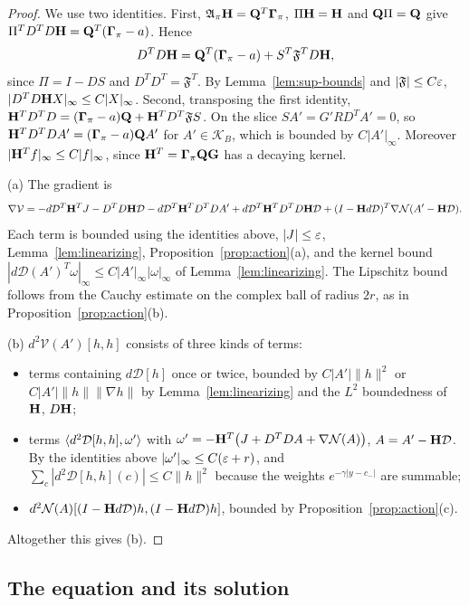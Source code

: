 \begin{proof}
We use two identities. First, $\mathfrak A_\pi\mathbf H=\mathbf Q^T\boldsymbol\Gamma_\pi$, $\Pi\mathbf H=\mathbf H$ and $\mathbf Q\Pi=\mathbf Q$ give $\Pi^TD^TD\mathbf H=\mathbf Q^T(\boldsymbol\Gamma_\pi-a)$. Hence
\[
D^TD\mathbf H=\mathbf Q^T(\boldsymbol\Gamma_\pi-a)+S^T\mathfrak F^TD\mathbf H ,
\]
since $\Pi=I-DS$ and $D^TD^T=\mathfrak F^T$. By Lemma~\ref{lem:sup-bounds} and $|\mathfrak F|\le C\varepsilon$, $|D^TD\mathbf H X|_\infty\le C|X|_\infty$. Second, transposing the first identity, $\mathbf H^TD^TD=(\boldsymbol\Gamma_\pi-a)\mathbf Q+\mathbf H^TD^T\mathfrak FS$. On the slice $SA'=G'RD^TA'=0$, so $\mathbf H^TD^TDA'=(\boldsymbol\Gamma_\pi-a)\mathbf Q A'$ for $A'\in\mathcal K_B$, which is bounded by $C|A'|_\infty$. Moreover $|\mathbf H^Tf|_\infty\le C|f|_\infty$, since $\mathbf H^T=\boldsymbol\Gamma_\pi\mathbf Q\mathbf G$ has a decaying kernel.

(a) The gradient is
\[
\nabla\mathcal V=-d\mathcal D^T\mathbf H^TJ-D^TD\mathbf H\mathcal D-d\mathcal D^T\mathbf H^TD^TDA'+d\mathcal D^T\mathbf H^TD^TD\mathbf H\mathcal D+(I-\mathbf H d\mathcal D)^T\nabla\mathcal N(A'-\mathbf H\mathcal D).
\]
Each term is bounded using the identities above, $|J|\le\varepsilon$, Lemma~\ref{lem:linearizing}, Proposition~\ref{prop:action}(a), and the kernel bound $|d\mathcal D(A')^T\omega|_\infty\le C|A'|_\infty|\omega|_\infty$ of Lemma~\ref{lem:linearizing}. The Lipschitz bound follows from the Cauchy estimate on the complex ball of radius $2r$, as in Proposition~\ref{prop:action}(b).

(b) $d^2\mathcal V(A')[h,h]$ consists of three kinds of terms:
\begin{itemize}
\item terms containing $d\mathcal D[h]$ once or twice, bounded by $C|A'|\|h\|^2$ or $C|A'|\|h\|\|\nabla h\|$ by Lemma~\ref{lem:linearizing} and the $L^2$ boundedness of $\mathbf H$, $D\mathbf H$;
\item terms $\langle d^2\mathcal D[h,h],\omega'\rangle$ with $\omega'=-\mathbf H^T\big(J+D^TDA+\nabla\mathcal N(A)\big)$, $A=A'-\mathbf H\mathcal D$. By the identities above $|\omega'|_\infty\le C(\varepsilon+r)$, and $\sum_c|d^2\mathcal D[h,h](c)|\le C\|h\|^2$ because the weights $e^{-\gamma|y-c_-|}$ are summable;
\item $d^2\mathcal N(A)[(I-\mathbf H d\mathcal D)h,(I-\mathbf H d\mathcal D)h]$, bounded by Proposition~\ref{prop:action}(c).
\end{itemize}
Altogether this gives (b).
\end{proof}

\subsection{The equation and its solution}

